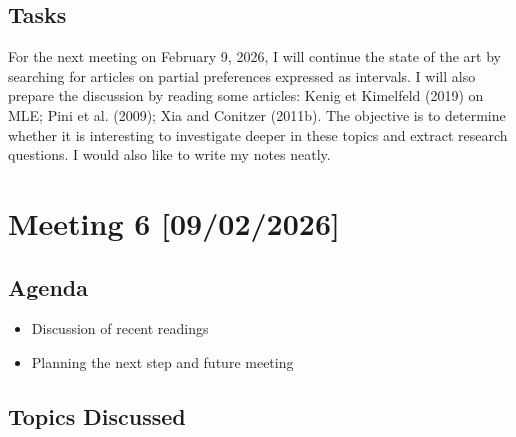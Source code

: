 \documentclass{article}
\begin{document}
\subsection{Tasks}
For the next meeting on February 9, 2026, I will continue the state of the art by searching for articles on partial preferences expressed as intervals.
I will also prepare the discussion by reading some articles: Kenig et Kimelfeld (2019) on MLE; Pini et al. (2009); Xia and Conitzer (2011b). The objective is to determine whether it is interesting to investigate deeper in these topics and extract research questions.
I would also like to write my notes neatly.
\newpage


\section{Meeting 6 [09/02/2026]}

\subsection{Agenda}
\begin{itemize}
    \item Discussion of recent readings
    \item Planning the next step and future meeting
\end{itemize}

\subsection{Topics Discussed}
\end{document}
